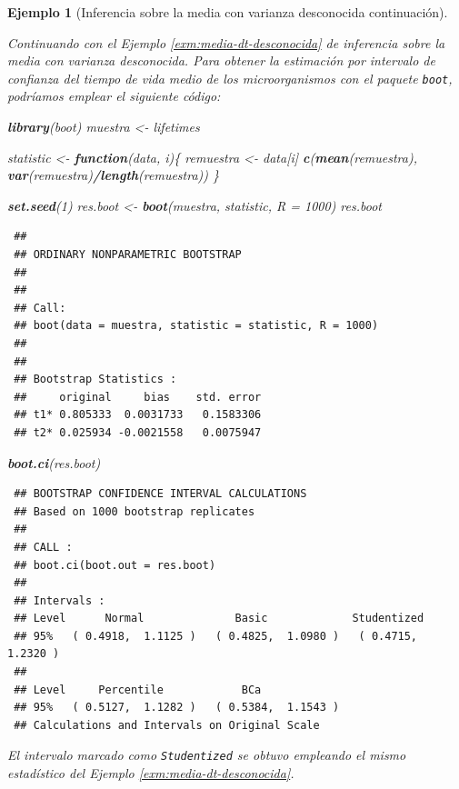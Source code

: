 \documentclass[
  spanish,
  10pt,
]{book}
\newenvironment{Shaded}{\begin{snugshade}}{\end{snugshade}}
\newcommand{\AttributeTok}[1]{\textcolor[rgb]{0.13,0.29,0.53}{#1}}
\newcommand{\ControlFlowTok}[1]{\textcolor[rgb]{0.13,0.29,0.53}{\textbf{#1}}}
\newcommand{\DecValTok}[1]{\textcolor[rgb]{0.00,0.00,0.81}{#1}}
\newcommand{\FunctionTok}[1]{\textcolor[rgb]{0.13,0.29,0.53}{\textbf{#1}}}
\newcommand{\NormalTok}[1]{#1}
\newcommand{\OtherTok}[1]{\textcolor[rgb]{0.56,0.35,0.01}{#1}}
\newcommand{\SpecialCharTok}[1]{\textcolor[rgb]{0.81,0.36,0.00}{\textbf{#1}}}
\theoremstyle{break}
\newtheorem{example}{Ejemplo}[chapter]
\theoremstyle{nonumberplain}
\begin{document}
\begin{example}[Inferencia sobre la media con varianza desconocida continuación]
\protect\hypertarget{exm:media-dt-desconocida-boot}{}\label{exm:media-dt-desconocida-boot}

Continuando con el Ejemplo \ref{exm:media-dt-desconocida} de
inferencia sobre la media con varianza desconocida.
Para obtener la estimación por intervalo de confianza del tiempo de vida medio
de los microorganismos con el paquete \texttt{boot}, podríamos emplear
el siguiente código:

\begin{Shaded}
\begin{Highlighting}[]
\FunctionTok{library}\NormalTok{(boot)}
\NormalTok{muestra }\OtherTok{\textless{}{-}}\NormalTok{ lifetimes}

\NormalTok{statistic }\OtherTok{\textless{}{-}} \ControlFlowTok{function}\NormalTok{(data, i)\{}
\NormalTok{  remuestra }\OtherTok{\textless{}{-}}\NormalTok{ data[i]}
  \FunctionTok{c}\NormalTok{(}\FunctionTok{mean}\NormalTok{(remuestra), }\FunctionTok{var}\NormalTok{(remuestra)}\SpecialCharTok{/}\FunctionTok{length}\NormalTok{(remuestra))}
\NormalTok{\}}

\FunctionTok{set.seed}\NormalTok{(}\DecValTok{1}\NormalTok{)}
\NormalTok{res.boot }\OtherTok{\textless{}{-}} \FunctionTok{boot}\NormalTok{(muestra, statistic, }\AttributeTok{R =} \DecValTok{1000}\NormalTok{)}
\NormalTok{res.boot}
\end{Highlighting}
\end{Shaded}

\begin{verbatim}
 ## 
 ## ORDINARY NONPARAMETRIC BOOTSTRAP
 ## 
 ## 
 ## Call:
 ## boot(data = muestra, statistic = statistic, R = 1000)
 ## 
 ## 
 ## Bootstrap Statistics :
 ##     original     bias    std. error
 ## t1* 0.805333  0.0031733   0.1583306
 ## t2* 0.025934 -0.0021558   0.0075947
\end{verbatim}

\begin{Shaded}
\begin{Highlighting}[]
\FunctionTok{boot.ci}\NormalTok{(res.boot)}
\end{Highlighting}
\end{Shaded}

\begin{verbatim}
 ## BOOTSTRAP CONFIDENCE INTERVAL CALCULATIONS
 ## Based on 1000 bootstrap replicates
 ## 
 ## CALL : 
 ## boot.ci(boot.out = res.boot)
 ## 
 ## Intervals : 
 ## Level      Normal              Basic             Studentized     
 ## 95%   ( 0.4918,  1.1125 )   ( 0.4825,  1.0980 )   ( 0.4715,  1.2320 )  
 ## 
 ## Level     Percentile            BCa          
 ## 95%   ( 0.5127,  1.1282 )   ( 0.5384,  1.1543 )  
 ## Calculations and Intervals on Original Scale
\end{verbatim}

El intervalo marcado como \texttt{Studentized} se obtuvo empleando el mismo estadístico del Ejemplo \ref{exm:media-dt-desconocida}.
\end{example}
\end{document}
